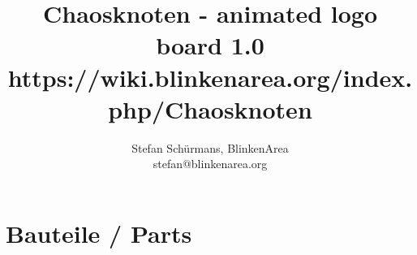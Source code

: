 \documentclass[a4paper]{article}
\begin{document}
\setlength{\parindent}{0in}

\title{Chaosknoten - animated logo board 1.0 \\
       https://wiki.blinkenarea.org/index.php/Chaosknoten}

\author{Stefan Schürmans, BlinkenArea \\
        stefan@blinkenarea.org}

\maketitle

\section{Bauteile / Parts}
\label{sec:parts}
\end{document}
